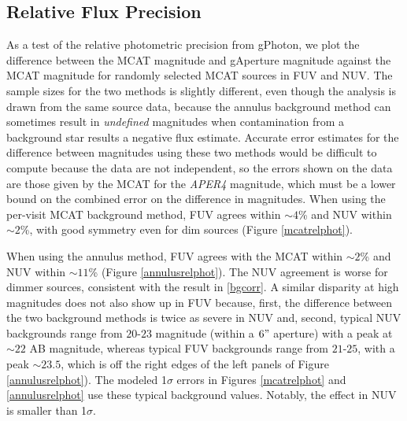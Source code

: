 \documentclass[iop]{emulateapj}
\begin{document}
\subsection{Relative Flux Precision}
\label{relflux}
As a test of the relative photometric precision from gPhoton, we plot the difference between the MCAT magnitude and gAperture magnitude against the MCAT magnitude for randomly selected MCAT sources in FUV and NUV. The sample sizes for the two methods is slightly different, even though the analysis is drawn from the same source data, because the annulus background method can sometimes result in \emph{undefined} magnitudes when contamination from a background star results a negative flux estimate. Accurate error estimates for the difference between magnitudes using these two methods would be difficult to compute because the data are not independent, so the errors shown on the data are those given by the MCAT for the \emph{APER4} magnitude, which must be a lower bound on the combined error on the difference in magnitudes. When using the per-visit MCAT background method, FUV agrees within $\sim 4$\% and NUV within $\sim 2$\%, with good symmetry even for dim sources (Figure \ref{mcatrelphot}).

When using the annulus method, FUV agrees with the MCAT within $\sim 2$\% and NUV within $\sim 11$\% (Figure \ref{annulusrelphot}). The NUV agreement is worse for dimmer sources, consistent with the result in \ref{bgcorr}. A similar disparity at high magnitudes does not also show up in FUV because, first, the difference between the two background methods is twice as severe in NUV and, second, typical NUV backgrounds range from $20$-$23$ magnitude (within a $6"$ aperture) with a peak at $\sim 22$ AB magnitude, whereas typical FUV backgrounds range from $21$-$25$, with a peak $\sim 23.5$, which is off the right edges of the left panels of Figure \ref{annulusrelphot}). The modeled 1$\sigma$ errors in Figures \ref{mcatrelphot} and \ref{annulusrelphot} use these typical background values. Notably, the effect in NUV is smaller than 1$\sigma$.
\end{document}
